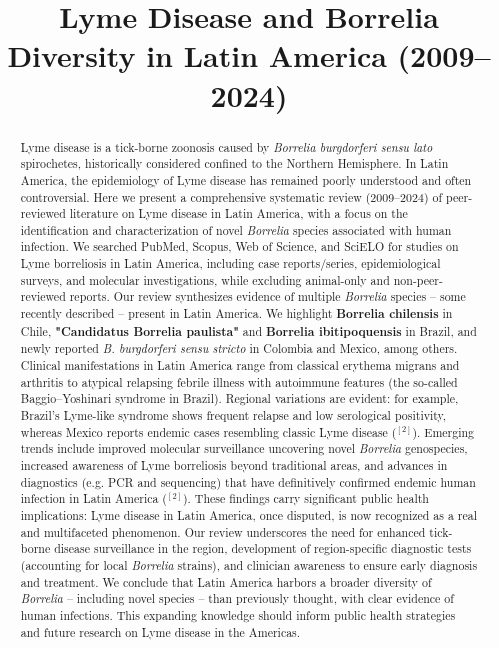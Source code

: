 \documentclass[11pt,letterpaper]{article}
\title{\vspace{-1.5cm}\Large\bfseries Lyme Disease and Borrelia Diversity in Latin America (2009–2024)}
\author{}
\date{}
\newcommand{\mycite}[1]{$^{[#1]}$}
\begin{document}
\maketitle
\thispagestyle{fancy}

\begin{abstract}
\noindent
Lyme disease is a tick-borne zoonosis caused by \textit{Borrelia burgdorferi sensu lato} spirochetes, historically considered confined to the Northern Hemisphere. In Latin America, the epidemiology of Lyme disease has remained poorly understood and often controversial. Here we present a comprehensive systematic review (2009–2024) of peer-reviewed literature on Lyme disease in Latin America, with a focus on the identification and characterization of novel \textit{Borrelia} species associated with human infection. We searched PubMed, Scopus, Web of Science, and SciELO for studies on Lyme borreliosis in Latin America, including case reports/series, epidemiological surveys, and molecular investigations, while excluding animal-only and non-peer-reviewed reports. Our review synthesizes evidence of multiple \textit{Borrelia} species – some recently described – present in Latin America. We highlight \textbf{Borrelia chilensis} in Chile, \textbf{"Candidatus Borrelia paulista"} and \textbf{Borrelia ibitipoquensis} in Brazil, and newly reported \textit{B. burgdorferi sensu stricto} in Colombia and Mexico, among others. Clinical manifestations in Latin America range from classical erythema migrans and arthritis to atypical relapsing febrile illness with autoimmune features (the so-called Baggio–Yoshinari syndrome in Brazil). Regional variations are evident: for example, Brazil's Lyme-like syndrome shows frequent relapse and low serological positivity, whereas Mexico reports endemic cases resembling classic Lyme disease (\mycite{2}). Emerging trends include improved molecular surveillance uncovering novel \textit{Borrelia} genospecies, increased awareness of Lyme borreliosis beyond traditional areas, and advances in diagnostics (e.g. PCR and sequencing) that have definitively confirmed endemic human infection in Latin America (\mycite{2}). These findings carry significant public health implications: Lyme disease in Latin America, once disputed, is now recognized as a real and multifaceted phenomenon. Our review underscores the need for enhanced tick-borne disease surveillance in the region, development of region-specific diagnostic tests (accounting for local \textit{Borrelia} strains), and clinician awareness to ensure early diagnosis and treatment. We conclude that Latin America harbors a broader diversity of \textit{Borrelia} – including novel species – than previously thought, with clear evidence of human infections. This expanding knowledge should inform public health strategies and future research on Lyme disease in the Americas.
\end{abstract}
\end{document}
